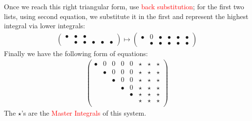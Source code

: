 \documentclass[10pt]{article}
\begin{document}
Once we reach this right triangular form, use \textcolor{red}{back substitution}; for the first two lists, using second equation, we substitute it in the first and represent the highest integral via lower integrals:
\begin{eqnarray}
\nonumber
\left(\begin{array}{cccccccc} 
\bullet & \bullet & \bullet \\
&\bullet & \bullet & \bullet & \bullet &\bullet 
\end{array}\right)
\mapsto
\left(\begin{array}{cccccccc} 
\bullet & 0 & \bullet & \bullet & \bullet &\bullet \\
&\bullet & \bullet & \bullet & \bullet &\bullet 
\end{array}\right)
\end{eqnarray}
Finally we have the following form of equations:
\begin{eqnarray}
\nonumber
\left(\begin{array}{cccccccc} 
\bullet & 0 & 0&0&0 & \star & \star & \star \\
&\bullet & 0 & 0 & 0 & \star & \star & \star \\
&&\bullet &0 &0 & \star & \star & \star \\
&&& \bullet & 0 & \star & \star & \star \\
&&&&\bullet & \star & \star & \star \\
&&&&&\star & \star & \star\\
\end{array}\right)
\end{eqnarray}
The $\star$'s are the \textcolor{red}{Master Integrals} of this system.
\end{document}
